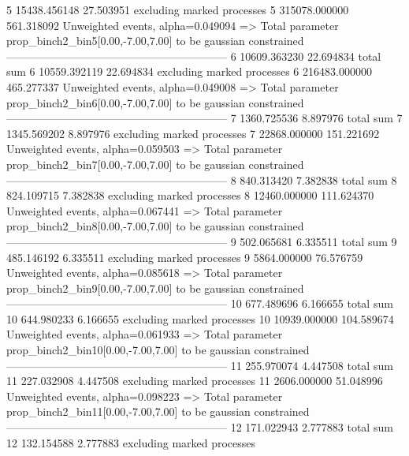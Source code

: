 5          15438.456148    27.503951       excluding marked processes    
5          315078.000000   561.318092      Unweighted events, alpha=0.049094
  => Total parameter prop_binch2_bin5[0.00,-7.00,7.00] to be gaussian constrained
------------------------------------------------------------
6          10609.363230    22.694834       total sum                     
6          10559.392119    22.694834       excluding marked processes    
6          216483.000000   465.277337      Unweighted events, alpha=0.049008
  => Total parameter prop_binch2_bin6[0.00,-7.00,7.00] to be gaussian constrained
------------------------------------------------------------
7          1360.725536     8.897976        total sum                     
7          1345.569202     8.897976        excluding marked processes    
7          22868.000000    151.221692      Unweighted events, alpha=0.059503
  => Total parameter prop_binch2_bin7[0.00,-7.00,7.00] to be gaussian constrained
------------------------------------------------------------
8          840.313420      7.382838        total sum                     
8          824.109715      7.382838        excluding marked processes    
8          12460.000000    111.624370      Unweighted events, alpha=0.067441
  => Total parameter prop_binch2_bin8[0.00,-7.00,7.00] to be gaussian constrained
------------------------------------------------------------
9          502.065681      6.335511        total sum                     
9          485.146192      6.335511        excluding marked processes    
9          5864.000000     76.576759       Unweighted events, alpha=0.085618
  => Total parameter prop_binch2_bin9[0.00,-7.00,7.00] to be gaussian constrained
------------------------------------------------------------
10         677.489696      6.166655        total sum                     
10         644.980233      6.166655        excluding marked processes    
10         10939.000000    104.589674      Unweighted events, alpha=0.061933
  => Total parameter prop_binch2_bin10[0.00,-7.00,7.00] to be gaussian constrained
------------------------------------------------------------
11         255.970074      4.447508        total sum                     
11         227.032908      4.447508        excluding marked processes    
11         2606.000000     51.048996       Unweighted events, alpha=0.098223
  => Total parameter prop_binch2_bin11[0.00,-7.00,7.00] to be gaussian constrained
------------------------------------------------------------
12         171.022943      2.777883        total sum                     
12         132.154588      2.777883        excluding marked processes    
